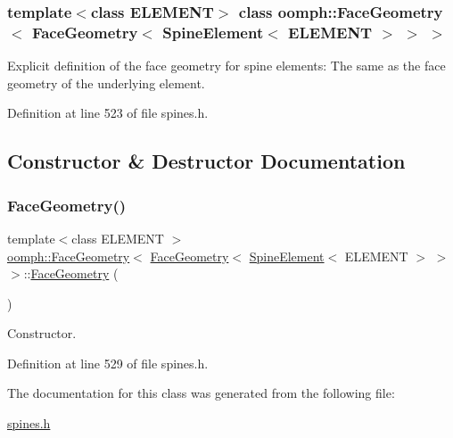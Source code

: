 \subsubsection*{template$<$class E\+L\+E\+M\+E\+NT$>$\newline
class oomph\+::\+Face\+Geometry$<$ Face\+Geometry$<$ Spine\+Element$<$ E\+L\+E\+M\+E\+N\+T $>$ $>$ $>$}

Explicit definition of the face geometry for spine elements\+: The same as the face geometry of the underlying element. 

Definition at line 523 of file spines.\+h.



\subsection{Constructor \& Destructor Documentation}
\mbox{\label{classoomph_1_1FaceGeometry_3_01FaceGeometry_3_01SpineElement_3_01ELEMENT_01_4_01_4_01_4_a995321d6c1cd85b5d3b2c6d464861af0}} 
\subsubsection{\texorpdfstring{Face\+Geometry()}{FaceGeometry()}}
{\footnotesize\ttfamily template$<$class E\+L\+E\+M\+E\+NT $>$ \\
\hyperlink{classoomph_1_1FaceGeometry}{oomph\+::\+Face\+Geometry}$<$ \hyperlink{classoomph_1_1FaceGeometry}{Face\+Geometry}$<$ \hyperlink{classoomph_1_1SpineElement}{Spine\+Element}$<$ E\+L\+E\+M\+E\+NT $>$ $>$ $>$\+::\hyperlink{classoomph_1_1FaceGeometry}{Face\+Geometry} (\begin{DoxyParamCaption}{ }\end{DoxyParamCaption})\hspace{0.3cm}{\ttfamily [inline]}}



Constructor. 



Definition at line 529 of file spines.\+h.



The documentation for this class was generated from the following file\+:\begin{DoxyCompactItemize}
\item 
\hyperlink{spines_8h}{spines.\+h}\end{DoxyCompactItemize}
